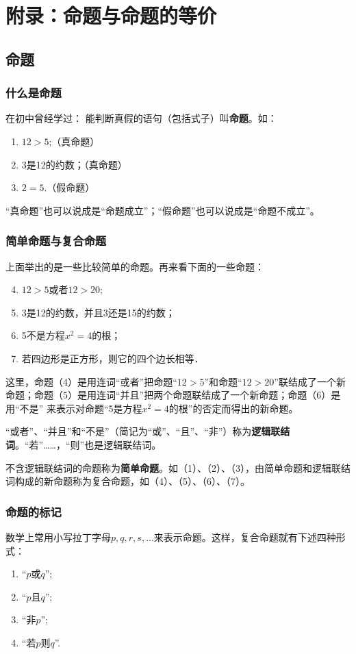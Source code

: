 \chapter{附录：命题与命题的等价}

\section*{命题}

\subsection*{什么是命题}

在初中曾经学过：
能判断真假的语句（包括式子）叫\textbf{命题}。如：
\begin{enumerate}[(1)]
    \item $12>5$;\hfill     （真命题）
    \item  3是12的约数；\hfill     （真命题）
    \item $2=5$.\hfill（假命题）
\end{enumerate}

“真命题”也可以说成是“命题成立”；“假命题”也可以说成是“命题不成立”。

\subsection*{简单命题与复合命题}
上面举出的是一些比较简单的命题。再来看下面的一些命题：
\begin{enumerate}[(1)]
\setcounter{enumi}{3}
    \item $12>5$或者$12>20$;
    \item 3是12的约数，并且3还是15的约数；
    \item 5不是方程$x^2=4$的根；
    \item 若四边形是正方形，则它的四个边长相等．
\end{enumerate}

这里，命题（4）是用连词“或者”把命题“$12>5$”和命题“$12>20$”联结成了一个新命题；命题（5）是用连词“并且”把两个命题联结成了一个新命题；命题（6）是用“不是”
来表示对命题“5是方程$x^2=4$的根”的否定而得出的新命题。

“或者”、“并且”和“不是”（简记为“或”、“且”、“非”）称为\textbf{逻辑联结词}。“若”……，“则”也是逻辑联结词。

不含逻辑联结词的命题称为\textbf{简单命题}。如（1）、（2）、（3），由简单命题和逻辑联结词构成的新命题称为复合命题，如（4）、（5）、（6）、（7）。

\subsection*{命题的标记}
数学上常用小写拉丁字母$p,q,r,s,\ldots$来表示命题。这样，复合命题就有下述四种形式：
\begin{multicols}{4}
\begin{enumerate}
    \item “$p$或$q$”;
    \item “$p$且$q$”;
    \item  “非$p$”;
    \item  “若$p$则$q$”.
\end{enumerate}    
\end{multicols}

